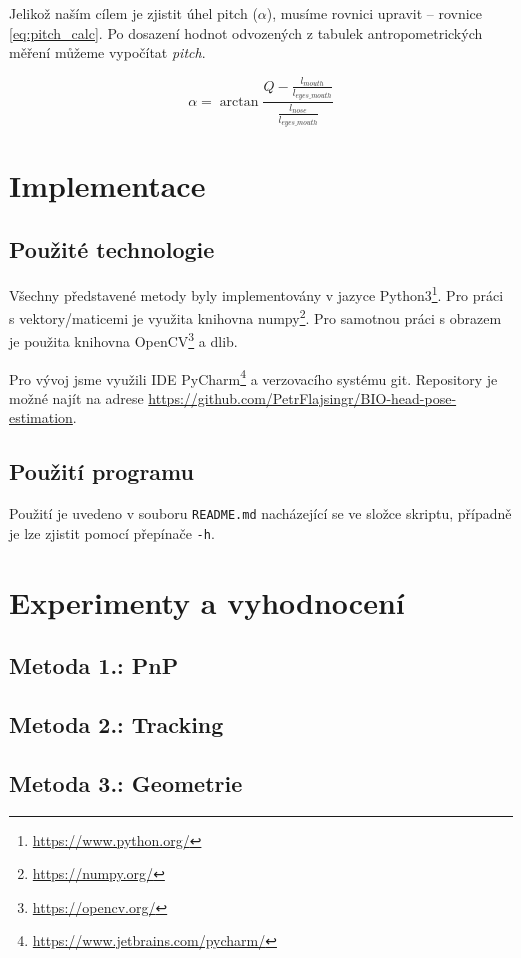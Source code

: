 \documentclass[12pt,a4paper,titlepage,final]{report}
\begin{document}
Jelikož naším cílem je zjistit úhel pitch ($\alpha$), musíme rovnici upravit -- rovnice \ref{eq:pitch_calc}. Po dosazení hodnot odvozených z tabulek antropometrických měření můžeme vypočítat \textit{pitch}.

\begin{equation}\label{eq:pitch_calc}
\alpha = \arctan{\frac{Q - \frac{l_{mouth}}{l_{eyes\_mouth}}}{\frac{l_{nose}}{l_{eyes\_mouth}}}}
\end{equation}

\section{Implementace}
\subsection{Použité technologie}
Všechny představené metody byly implementovány v jazyce Python3\footnote{\url{https://www.python.org/}}. Pro práci s vektory/maticemi je využita knihovna numpy\footnote{\url{https://numpy.org/}}. Pro samotnou práci s obrazem je použita knihovna OpenCV\footnote{\url{https://opencv.org/}} a dlib. 

Pro vývoj jsme využili IDE PyCharm\footnote{\url{https://www.jetbrains.com/pycharm/}} a verzovacího systému git. Repository je možné najít na adrese \url{https://github.com/PetrFlajsingr/BIO-head-pose-estimation}.
\subsection{Použití programu}
Použití je uvedeno v souboru \texttt{README.md} nacházející se ve složce skriptu, případně je lze zjistit pomocí přepínače \texttt{-h}.

\section{Experimenty a vyhodnocení}
\subsection{Metoda 1.: PnP}
\subsection{Metoda 2.: Tracking}
\subsection{Metoda 3.: Geometrie}
\end{document}
